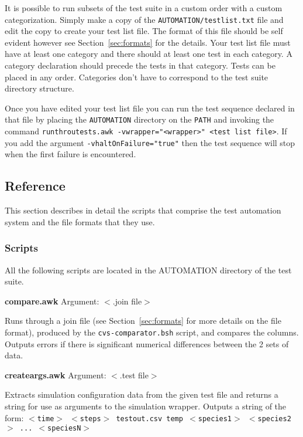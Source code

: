 \documentclass{cekarticle}
\begin{document}
It is possible to run subsets of the test suite in a custom order
with a custom categorization.  Simply make a copy of the
\texttt{AUTOMATION/testlist.txt} file and edit the copy to create
your test list file. The format of this file should be self
evident however see Section~\ref{sec:formats} for the details.
Your test list file must have at least one category and there
should at least one test in each category.  A category declaration
should precede the tests in that category.  Tests can be placed in
any order. Categories don't have to correspond to the test suite
directory structure.

Once you have edited your test list file you can run the test
sequence declared in that file by placing the \texttt{AUTOMATION}
directory on the \texttt{PATH} and invoking the command
\texttt{runthroutests.awk -vwrapper="<wrapper>" <test list file>}.
If you add the argument \texttt{-vhaltOnFailure="true"} then the
test sequence will stop when the first failure is encountered.

\subsection{Reference} \label{sec:auto-reference}

This section describes in detail the scripts that comprise the
test automation system and the file formats that they use.

\subsubsection{Scripts}

All the following scripts are located in the AUTOMATION directory
of the test suite.

\textbf{compare.awk} Argument: $<$.join file$>$

Runs through a join file (see Section~\ref{sec:formats} for more
details on the file format), produced by the
\texttt{cvs-comparator.bsh} script, and compares the columns.
Outputs errors if there is significant numerical differences
between the 2 sets of data.

\textbf{createargs.awk} Argument: $<$.test file$>$

Extracts simulation configuration data from the given test file
and returns a string for use as arguments to the simulation
wrapper. Outputs a string of the form: \texttt{$<$time$>$
$<$steps$>$ testout.csv temp $<$species1$>$ $<$species2$>$ ...
$<$speciesN$>$}
\end{document}
